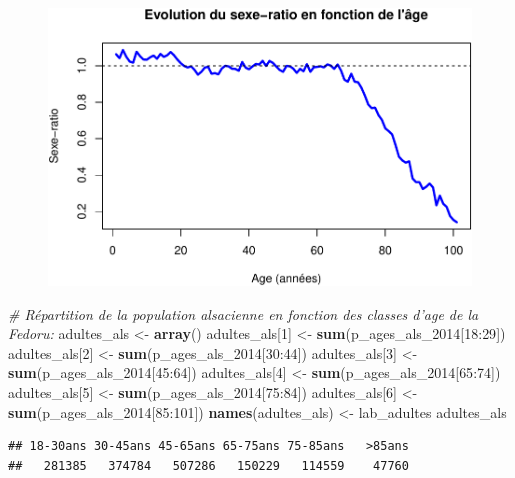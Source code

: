 \documentclass[]{article}
\newenvironment{Shaded}{\begin{snugshade}}{\end{snugshade}}
\newcommand{\KeywordTok}[1]{\textcolor[rgb]{0.13,0.29,0.53}{\textbf{{#1}}}}
\newcommand{\DecValTok}[1]{\textcolor[rgb]{0.00,0.00,0.81}{{#1}}}
\newcommand{\StringTok}[1]{\textcolor[rgb]{0.31,0.60,0.02}{{#1}}}
\newcommand{\CommentTok}[1]{\textcolor[rgb]{0.56,0.35,0.01}{\textit{{#1}}}}
\newcommand{\NormalTok}[1]{{#1}}
\begin{document}
\begin{figure}[htbp]
\centering
\includegraphics{./age_files/figure-latex/pop_als-3.pdf}
\end{figure}

\begin{Shaded}
\begin{Highlighting}[]
\CommentTok{# Répartition de la population alsacienne en fonction des classes d'age de la Fedoru:}
\NormalTok{adultes_als <-}\StringTok{ }\KeywordTok{array}\NormalTok{()}
\NormalTok{adultes_als[}\DecValTok{1}\NormalTok{] <-}\StringTok{ }\KeywordTok{sum}\NormalTok{(p_ages_als_2014[}\DecValTok{18}\NormalTok{:}\DecValTok{29}\NormalTok{])}
\NormalTok{adultes_als[}\DecValTok{2}\NormalTok{] <-}\StringTok{ }\KeywordTok{sum}\NormalTok{(p_ages_als_2014[}\DecValTok{30}\NormalTok{:}\DecValTok{44}\NormalTok{])}
\NormalTok{adultes_als[}\DecValTok{3}\NormalTok{] <-}\StringTok{ }\KeywordTok{sum}\NormalTok{(p_ages_als_2014[}\DecValTok{45}\NormalTok{:}\DecValTok{64}\NormalTok{])}
\NormalTok{adultes_als[}\DecValTok{4}\NormalTok{] <-}\StringTok{ }\KeywordTok{sum}\NormalTok{(p_ages_als_2014[}\DecValTok{65}\NormalTok{:}\DecValTok{74}\NormalTok{])}
\NormalTok{adultes_als[}\DecValTok{5}\NormalTok{] <-}\StringTok{ }\KeywordTok{sum}\NormalTok{(p_ages_als_2014[}\DecValTok{75}\NormalTok{:}\DecValTok{84}\NormalTok{])}
\NormalTok{adultes_als[}\DecValTok{6}\NormalTok{] <-}\StringTok{ }\KeywordTok{sum}\NormalTok{(p_ages_als_2014[}\DecValTok{85}\NormalTok{:}\DecValTok{101}\NormalTok{])}
\KeywordTok{names}\NormalTok{(adultes_als) <-}\StringTok{ }\NormalTok{lab_adultes}
\NormalTok{adultes_als}
\end{Highlighting}
\end{Shaded}

\begin{verbatim}
## 18-30ans 30-45ans 45-65ans 65-75ans 75-85ans   >85ans 
##   281385   374784   507286   150229   114559    47760
\end{verbatim}
\end{document}
